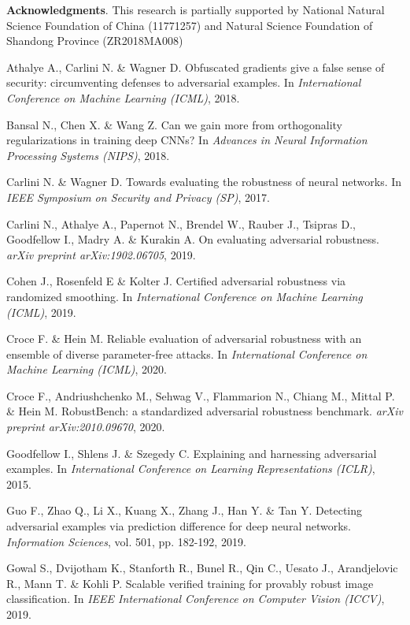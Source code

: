 \documentclass[preprint,review,12pt]{elsarticle}
\numberwithin{equation}{section}
\begin{document}
\bigskip
\textbf{Acknowledgments}. This research is partially supported by National Natural Science Foundation of China (11771257) and Natural Science Foundation of Shandong Province (ZR2018MA008)


\begin{thebibliography}{99}

Athalye A., Carlini N. \& Wagner D.
Obfuscated gradients give a false sense of security: circumventing defenses to adversarial examples.
In \textit{International Conference on Machine Learning (ICML)}, 2018.

Bansal N., Chen X. \& Wang Z.
Can we gain more from orthogonality regularizations in training deep CNNs?
In \textit{Advances in Neural Information Processing Systems (NIPS)}, 2018.

Carlini N. \& Wagner D.
Towards evaluating the robustness of neural networks.
In \textit{IEEE Symposium on Security and Privacy (SP)}, 2017.

Carlini N., Athalye A., Papernot N., Brendel W., Rauber J., Tsipras D., Goodfellow I., Madry A. \& Kurakin A.
On evaluating adversarial robustness.
\textit{arXiv preprint arXiv:1902.06705}, 2019.

Cohen J., Rosenfeld E \& Kolter J.
Certified adversarial robustness via randomized smoothing.
In \textit{International Conference on Machine Learning (ICML)}, 2019.

Croce F. \& Hein M.
Reliable evaluation of adversarial robustness with an ensemble of diverse parameter-free attacks.
In \textit{International Conference on Machine Learning (ICML)}, 2020.

Croce F., Andriushchenko M., Sehwag V., Flammarion N., Chiang M., Mittal P. \& Hein M.
RobustBench: a standardized adversarial robustness benchmark.
\textit{arXiv preprint arXiv:2010.09670}, 2020.

Goodfellow I., Shlens J. \&  Szegedy C.
Explaining and harnessing adversarial examples.
In \textit{International Conference on Learning Representations (ICLR)}, 2015.

Guo F., Zhao Q., Li X., Kuang X., Zhang J., Han Y. \& Tan Y.
Detecting adversarial examples via prediction difference for deep neural networks.
\textit{Information Sciences}, vol. 501, pp. 182-192, 2019.

Gowal S., Dvijotham K., Stanforth R., Bunel R., Qin C., Uesato J., Arandjelovic R., Mann T. \& Kohli P.
Scalable verified training for provably robust image classification.
In \textit{IEEE International Conference on Computer Vision (ICCV)}, 2019.


\end{thebibliography}
\end{document}
